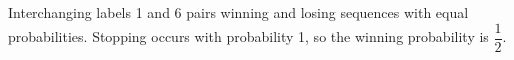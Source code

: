 Interchanging labels 1 and 6 pairs winning and losing sequences with equal probabilities. Stopping occurs with probability 1, so the winning probability is $\boxed{\dfrac{1}{2}}$.

